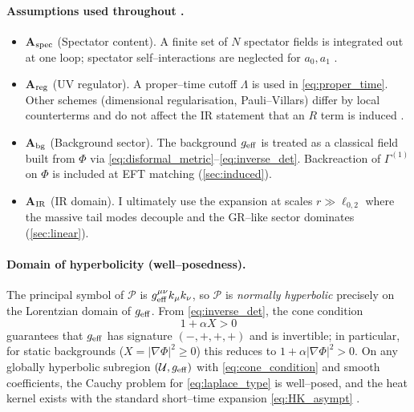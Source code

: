 \documentclass{iopjournal}
\begin{document}
\paragraph{Assumptions used throughout .}
\begin{itemize}
  \item \textbf{A\(_{\rm spec}\)} (Spectator content). A finite set of $N$ spectator fields is integrated out at one loop; spectator self–interactions are neglected for $a_0,a_1$ \cite{BirrellDavies,ParkerToms}.
  \item \textbf{A\(_{\rm reg}\)} (UV regulator). A proper–time cutoff $\Lambda$ is used in \eqref{eq:proper_time}. Other schemes (dimensional regularisation, Pauli–Villars) differ by local counterterms and do not affect the IR statement that an $R$ term is induced \cite{BarvinskyVilkovisky,ParkerToms}.
  \item \textbf{A\(_{\rm bg}\)} (Background sector). The background $g_{\rm eff}$ is treated as a classical field built from $\Phi$ via \eqref{eq:disformal_metric}–\eqref{eq:inverse_det}. Backreaction of $\Gamma^{(1)}$ on $\Phi$ is included at EFT matching (\cref{sec:induced}).
  \item \textbf{A\(_{\rm IR}\)} (IR domain). I ultimately use the expansion at scales $r\gg \ell_{0,2}$ where the massive tail modes decouple and the GR–like sector dominates (\cref{sec:linear}).
\end{itemize}

\paragraph{Domain of hyperbolicity (well–posedness).}
The principal symbol of $\mathcal{P}$ is $g_{\rm eff}^{\mu\nu}k_\mu k_\nu$, so $\mathcal{P}$ is \emph{normally hyperbolic} precisely on the Lorentzian domain of $g_{\rm eff}$. From \eqref{eq:inverse_det}, the cone condition
\begin{equation}
\boxed{\;1+\alpha X>0\;}
\label{eq:cone_condition}
\end{equation}
guarantees that $g_{\rm eff}$ has signature $(-,+,+,+)$ and is invertible; in particular, for static backgrounds ($X=|\nabla\Phi|^2\ge 0$) this reduces to $1+\alpha|\nabla\Phi|^2>0$. On any globally hyperbolic subregion $(\mathcal{U},g_{\rm eff})$ with \eqref{eq:cone_condition} and smooth coefficients, the Cauchy problem for \eqref{eq:laplace_type} is well–posed, and the heat kernel exists with the standard short–time expansion \eqref{eq:HK_asympt} \cite{BGV2007,Ringstrom2009,Vassilevich2003}.
\end{document}
